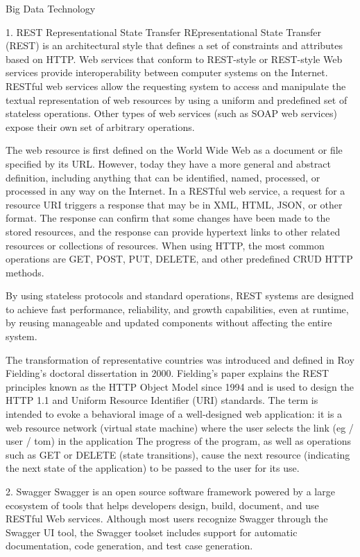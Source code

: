 Big Data Technology

1. REST Representational State Transfer
REpresentational State Transfer (REST) is an architectural style 
that defines a set of constraints and attributes based on HTTP. 
Web services that conform to REST-style or REST-style Web 
services provide interoperability between computer systems on the 
Internet. RESTful web services allow the requesting system to 
access and manipulate the textual representation of web resources 
by using a uniform and predefined set of stateless operations. 
Other types of web services (such as SOAP web services) expose 
their own set of arbitrary operations\cite{editor08}.

The web resource is first defined on the World Wide Web as a 
document or file specified by its URL. However, today they have a 
more general and abstract definition, including anything that can 
be identified, named, processed, or processed in any way on the 
Internet. In a RESTful web service, a request for a resource URI 
triggers a response that may be in XML, HTML, JSON, or other 
format. The response can confirm that some changes have been made 
to the stored resources, and the response can provide hypertext 
links to other related resources or collections of resources. 
When using HTTP, the most common operations are GET, POST, PUT, 
DELETE, and other predefined CRUD HTTP methods\cite{editor08}.

By using stateless protocols and standard operations, REST 
systems are designed to achieve fast performance, reliability, 
and growth capabilities, even at runtime, by reusing manageable 
and updated components without affecting the entire system\cite{editor08}.

The transformation of representative countries was introduced and 
defined in Roy Fielding's doctoral dissertation in 2000. 
Fielding's paper explains the REST principles known as the HTTP 
Object Model since 1994 and is used to design the HTTP 1.1 and 
Uniform Resource Identifier (URI) standards. The term is intended 
to evoke a behavioral image of a well-designed web application: it
 is a web resource network (virtual state machine) where the user 
selects the link (eg / user / tom) in the application The progress
 of the program, as well as operations such as GET or DELETE 
(state transitions), cause the next resource (indicating the next 
state of the application) to be passed to the user for its use\cite{editor08}.

2. Swagger
Swagger is an open source software framework powered by a large 
ecosystem of tools that helps developers design, build, document, 
and use RESTful Web services. Although most users recognize Swagger
 through the Swagger UI tool, the Swagger toolset includes support
 for automatic documentation, code generation, and test case 
generation\cite{editor09}.

